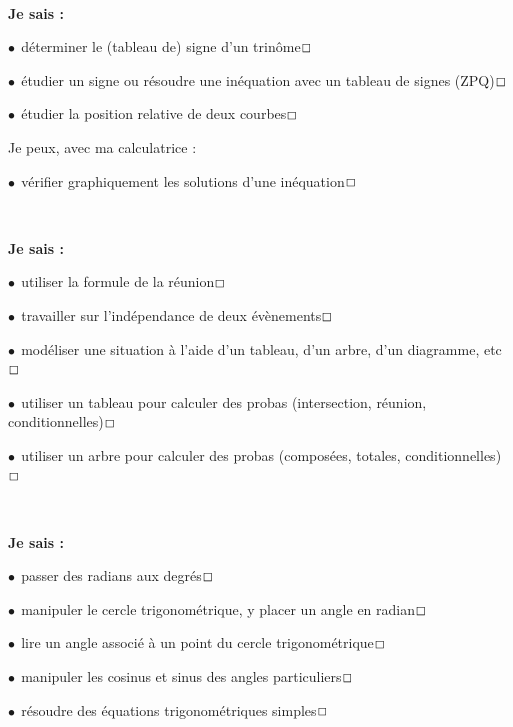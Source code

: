 \documentclass[a4paper,11pt]{article}
\begin{document}
\color{titrebleu}\,\hrulefill\,

\begin{casavoir}
\selectfont\small
\textbf{Je sais :}

\tabula{}$\bullet~~$déterminer le (tableau de) signe d'un trinôme\dotfill{}$\Large\Box$

\tabula{}$\bullet~~$étudier un signe ou résoudre une inéquation avec un tableau de signes (ZPQ)\dotfill{}$\Large\Box$

\tabula{}$\bullet~~$étudier la position relative de deux courbes\dotfill{}$\Large\Box$
\end{casavoir}

\begin{ccalco}
\selectfont\small
Je peux, avec ma calculatrice :

\tabula{}$\bullet~~$vérifier graphiquement les solutions d'une inéquation\dotfill{}$\Large\Box$
\end{ccalco}

\color{titrebleu}\,\hrulefill\,

\begin{casavoir}
\selectfont\small
\textbf{Je sais :}

\tabula{}$\bullet~~$utiliser la formule de la réunion\dotfill{}$\Large\Box$

\tabula{}$\bullet~~$travailler sur l'indépendance de deux évènements\dotfill{}$\Large\Box$

\tabula{}$\bullet~~$modéliser une situation à l'aide d'un tableau, d'un arbre, d'un diagramme, etc\dotfill{}$\Large\Box$

\tabula{}$\bullet~~$utiliser un tableau pour calculer des probas (intersection, réunion, conditionnelles)\dotfill{}$\Large\Box$

\tabula{}$\bullet~~$utiliser un arbre pour calculer des probas (composées, totales, conditionnelles)\dotfill{}$\Large\Box$
\end{casavoir}

\color{titrebleu}\,\hrulefill

\begin{casavoir}
\selectfont\small
\textbf{Je sais :}

\tabula{}$\bullet~~$passer des radians aux degrés\dotfill{}$\Large\Box$

\tabula{}$\bullet~~$manipuler le cercle trigonométrique, y placer un angle en radian\dotfill{}$\Large\Box$

\tabula{}$\bullet~~$lire un angle associé à un point du cercle trigonométrique\dotfill{}$\Large\Box$

\tabula{}$\bullet~~$manipuler les cosinus et sinus des angles particuliers\dotfill{}$\Large\Box$

\tabula{}$\bullet~~$résoudre des équations trigonométriques simples\dotfill{}$\Large\Box$
\end{casavoir}
\end{document}
